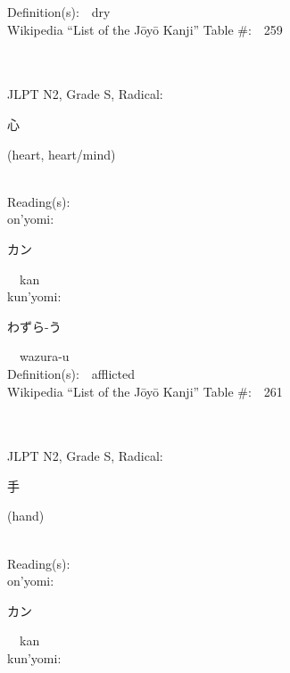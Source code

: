 \begin{multicols}{2}
Definition(s):\ \ dry \\
Wikipedia ``List of the J\=oy\=o Kanji'' Table \#:\ \ 259 \\
\ \ \\
{\fontsize{34pt}{40pt}  }\ \ \\  %
{JLPT N2, Grade S, Radical:\ \ {\begin{CJK}{UTF8}{min} 心 \end{CJK}} (heart, heart/mind) } \\
Reading(s):\ \ \\
{\hspace*{1em}}on'yomi:\ \ \\
{\hspace*{2em}}{\begin{CJK}{UTF8}{min} カン \end{CJK}}\ \ kan\ \ \\
{\hspace*{1em}}kun'yomi:\ \ \\
{\hspace*{2em}}{\begin{CJK}{UTF8}{min} わずら-う \end{CJK}}\ \ wazura-u\ \ \\
Definition(s):\ \ afflicted \\
Wikipedia ``List of the J\=oy\=o Kanji'' Table \#:\ \ 261 \\
\ \ \\
{\fontsize{34pt}{40pt}  }\ \ \\  %
{JLPT N2, Grade S, Radical:\ \ {\begin{CJK}{UTF8}{min} 手 \end{CJK}} (hand) } \\
Reading(s):\ \ \\
{\hspace*{1em}}on'yomi:\ \ \\
{\hspace*{2em}}{\begin{CJK}{UTF8}{min} カン \end{CJK}}\ \ kan\ \ \\
{\hspace*{1em}}kun'yomi:\ \ \\

\end{multicols}
